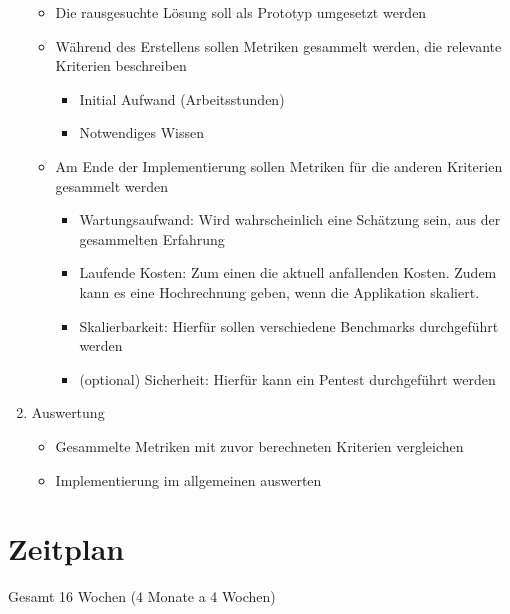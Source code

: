 \begin{enumerate}
  \begin{itemize}
  \item
    Die rausgesuchte Lösung soll als Prototyp umgesetzt werden
  \item
    Während des Erstellens sollen Metriken gesammelt werden, die
    relevante Kriterien beschreiben

    \begin{itemize}
    \item
      Initial Aufwand (Arbeitsstunden)
    \item
      Notwendiges Wissen
    \end{itemize}
  \item
    Am Ende der Implementierung sollen Metriken für die anderen
    Kriterien gesammelt werden

    \begin{itemize}
    \item
      Wartungsaufwand: Wird wahrscheinlich eine Schätzung sein, aus der
      gesammelten Erfahrung
    \item
      Laufende Kosten: Zum einen die aktuell anfallenden Kosten.
      Zudem kann es eine Hochrechnung geben, wenn die Applikation skaliert.
    \item
      Skalierbarkeit: Hierfür sollen verschiedene Benchmarks durchgeführt werden
    \item
      (optional) Sicherheit: Hierfür kann ein Pentest durchgeführt werden
    \end{itemize}
  \end{itemize}
\item
  Auswertung

  \begin{itemize}
  \item
    Gesammelte Metriken mit zuvor berechneten Kriterien vergleichen
  \item
    Implementierung im allgemeinen auswerten
  \end{itemize}
\end{enumerate}

\section{Zeitplan}\label{sec:zeitplan}

Gesamt 16 Wochen (4 Monate a 4 Wochen)

